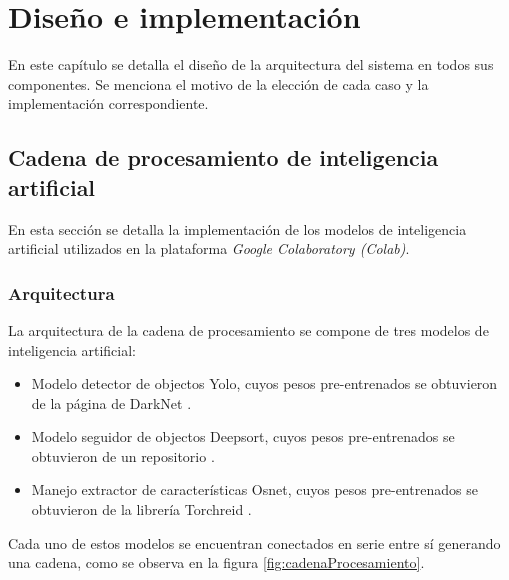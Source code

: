 \chapter{Diseño e implementación} %

\label{Chapter3} %

En este capítulo se detalla el diseño de la arquitectura del sistema en todos sus componentes. Se menciona el motivo de la elección de cada caso y la implementación correspondiente.


\section{Cadena de procesamiento de inteligencia artificial}
\label{sec:cadenaProcesamiento}

En esta sección se detalla la implementación de los modelos de inteligencia artificial utilizados en la plataforma \textit{Google Colaboratory (Colab)}.

\subsection{Arquitectura}

La arquitectura de la cadena de procesamiento se compone de tres modelos de inteligencia artificial:

\begin{itemize}
\item Modelo detector de objectos Yolo, cuyos pesos pre-entrenados se obtuvieron de la página de DarkNet \citep{YOLO_MODELO}.
\item Modelo seguidor de objectos Deepsort, cuyos pesos pre-entrenados se obtuvieron de un repositorio \citep{DEEPSORT_MODELO}.
\item Manejo extractor de características Osnet, cuyos pesos pre-entrenados se obtuvieron de la librería Torchreid \citep{OSNET_MODELO}.
\end{itemize}

Cada uno de estos modelos se encuentran conectados en serie entre sí generando una cadena, como se observa en la figura \ref{fig:cadenaProcesamiento}.


